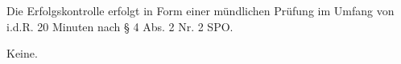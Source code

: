 \begin{course}

\setdoclanguagegerman
{}



\coursehead


\label{cour_8149.dp_997}


\begin{styleenv}
\begin{assessment}
Die Erfolgskontrolle erfolgt in Form einer mündlichen Prüfung im Umfang von i.d.R. 20 Minuten nach § 4 Abs. 2 Nr. 2 SPO.


\end{assessment}

\begin{conditions}Keine.\end{conditions}


\end{styleenv}

\begin{learningoutcomes}

\end{learningoutcomes}


\end{course}
